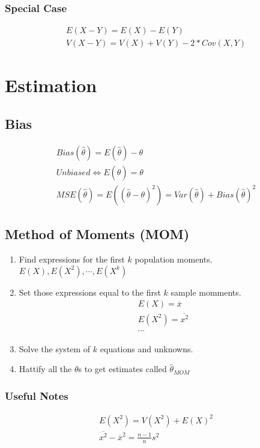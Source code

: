 \subsubsection{Special Case}
\begin{align}
  E(X - Y) = E(X) - E(Y) \\
  V(X - Y) = V(X) + V(Y) - 2 * Cov(X, Y)
\end{align}

\section{Estimation}
\subsection{Bias}
\begin{align}
  Bias(\hat{\theta}) = E(\hat{\theta}) - \theta \\
  Unbiased \iff E(\hat{\theta}) = \theta \\
  MSE(\hat{\theta}) = E((\hat{\theta} - \theta)^2) = Var(\hat{\theta}) + Bias(\hat{\theta})^2
\end{align}

\subsection{Method of Moments (MOM)}
\begin{enumerate}
\item Find expressions for the first $k$ population moments. $E(X), E(X^2), \cdots, E(X^k)$
\item Set those expressions equal to the first $k$ sample momments.
  \begin{align}
    E(X) = \overbar{x} \\
    E(X^2) = \overbar{x^2} \\
    \cdots
  \end{align}
\item Solve the system of $k$ equations and unknowns.
\item Hattify all the $\theta$s to get estimates called $\hat{\theta}_{MOM}$
\end{enumerate}

\subsubsection{Useful Notes}
\begin{align}
  E(X^2) = V(X^2) + E(X)^2 \\
  \overbar{x^2} - \overbar{x}^2 = \frac{n - 1}{n}s^2
\end{align}

